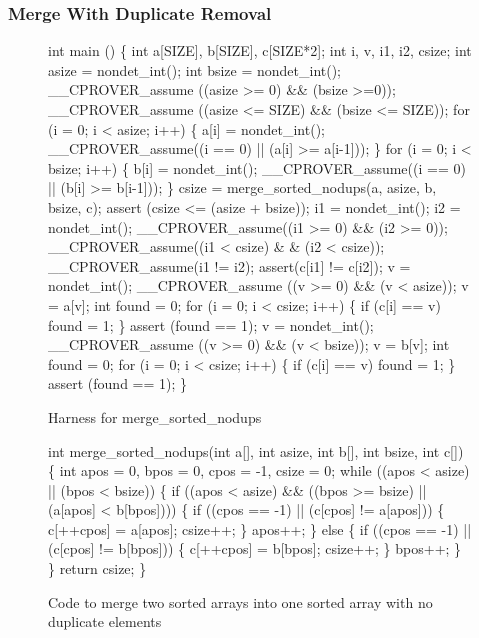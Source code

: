 \documentclass{svjour3}
\begin{document}
\subsubsection{Merge With Duplicate Removal}
\begin{figure}
{%
\begin{code}
int main () \{
  int a[SIZE], b[SIZE], c[SIZE*2];
  int i, v, i1, i2, csize;
  int asize = nondet\_int();
  int bsize = nondet\_int();
  \_\_CPROVER\_assume ((asize >= 0) \&\& (bsize >=0));
  \_\_CPROVER\_assume ((asize <= SIZE) \&\& (bsize <= SIZE));
  for (i = 0; i < asize; i++) \{
    a[i] = nondet\_int();
    \_\_CPROVER\_assume((i == 0) || (a[i] >= a[i-1]));
  \}
  for (i = 0; i < bsize; i++) \{
    b[i] = nondet\_int();
    \_\_CPROVER\_assume((i == 0) || (b[i] >= b[i-1]));
  \}
  csize = merge\_sorted\_nodups(a, asize, b, bsize, c);
  assert (csize <= (asize + bsize));
  i1 = nondet\_int();
  i2 = nondet\_int();
  \_\_CPROVER\_assume((i1 >= 0) \&\& (i2 >= 0));
  \_\_CPROVER\_assume((i1 < csize) \& \& (i2 < csize));
  \_\_CPROVER\_assume(i1 != i2);
  assert(c[i1] != c[i2]);
  v = nondet\_int();
  \_\_CPROVER\_assume ((v >= 0) \&\& (v < asize));
  v = a[v];
  int found = 0;
  for (i = 0; i < csize; i++) \{
    if (c[i] == v)
      found = 1;
  \}
  assert (found == 1);
  v = nondet\_int();
  \_\_CPROVER\_assume ((v >= 0) \&\& (v < bsize));
  v = b[v];
  int found = 0;
  for (i = 0; i < csize; i++) \{
    if (c[i] == v)
      found = 1;
  \}
  assert (found == 1);
\}
\end{code}
}
\caption{Harness for merge\_sorted\_nodups}
\label{fig:mergeharness}
\end{figure}

\begin{figure}
{%
\begin{code}
int merge\_sorted\_nodups(int a[], int asize, 
                        int b[], int bsize, int c[]) \{
  int apos = 0, bpos = 0, cpos = -1, csize = 0;
  while ((apos < asize) || (bpos < bsize)) \{
    if ((apos < asize) \&\& 
        ((bpos >= bsize) || (a[apos] < b[bpos]))) \{
      if ((cpos == -1) || (c[cpos] != a[apos])) \{
	c[++cpos] = a[apos];
	csize++;
      \}
      apos++;
    \} else \{
      if ((cpos == -1) || (c[cpos] != b[bpos])) \{
	c[++cpos] = b[bpos];
	csize++;
      \}
      bpos++;      
    \}
  \}
  return csize;
\}
\end{code}
}
\caption{Code to merge two sorted arrays into one sorted array with no
  duplicate elements}
\label{fig:sortnodup}
\end{figure}
\end{document}
